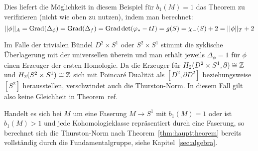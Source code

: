\begin{bsp}
        Dies liefert die Möglichkeit in diesem Beispiel für $b_1(M)=1$ das Theorem zu verifizieren (nicht wie oben zu nutzen), indem man berechnet: 
        \[
            ||\phi||_A=\operatorname{Grad}(\Delta_\phi)=\operatorname{Grad} (\Delta_f) = \operatorname{Grad} \det (\varphi_*-tI) = g(S) = \chi_-(S) +2 = ||\phi||_T+2
        \]

        Im Falle der trivialen Bündel $D^2\times S^1$ oder $S^2\times S^1$ stimmt die zyklische Überlagerung mit der universellen überein und man erhält jeweils $\Delta_\phi =1$ für $\phi$ einen Erzeuger der ersten Homologie. Da die Erzeuger für $H_2(D^2 \times S^1, \partial)\cong \mathbb{Z}$ und $H_2(S^2\times S^1) \cong \mathbb{Z}$ sich mit Poincaré Dualität als $[D^2,\partial D^2]$ beziehungsweise $[S^2]$ herausstellen, verschwindet auch die Thurston-Norm. In diesem Fall gilt also keine Gleichheit in Theorem~ref. 

    \end{bsp}

    \begin{bsp}
        Handelt es sich bei $M$ um eine Faserung $M\to S^1$ mit $b_1(M)=1$ oder ist $b_1(M)>1$ und jede Kohomologieklasse repräsentiert durch eine Faserung, so berechnet sich die Thurston-Norm nach Theorem~\ref{thm:haupttheorem} bereits vollständig durch die Fundamentalgruppe, siehe Kapitel~\ref{sec:algebra}.
    \end{bsp}


